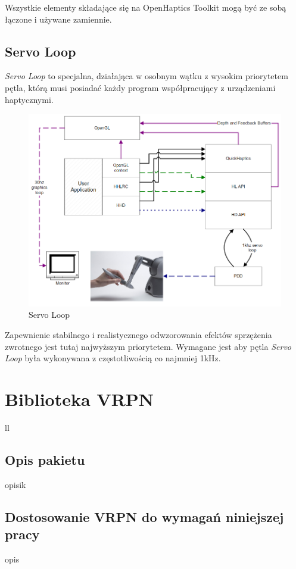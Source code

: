 \documentclass[licencjacka]{pracamgr}
\begin{document}
Wszystkie elementy składające się na OpenHaptics Toolkit mogą być ze sobą łączone i używane zamiennie. 

\section{Servo Loop}
\textit{Servo Loop} to specjalna, działająca w osobnym wątku z wysokim priorytetem pętla, którą musi posiadać każdy program współpracujący z urządzeniami haptycznymi.

\begin{figure}[H]
\centering
\includegraphics[scale=0.5,center]{servoloop}
\caption{Servo Loop}
\end{figure}

Zapewnienie stabilnego i realistycznego odwzorowania efektów sprzężenia zwrotnego jest tutaj najwyższym priorytetem. Wymagane jest aby pętla \textit{Servo Loop} była wykonywana z częstotliwością co najmniej 1kHz.

\chapter{Biblioteka VRPN}
ll

\section{Opis pakietu}
opisik

\section{Dostosowanie VRPN do wymagań niniejszej pracy}
opis
\end{document}
